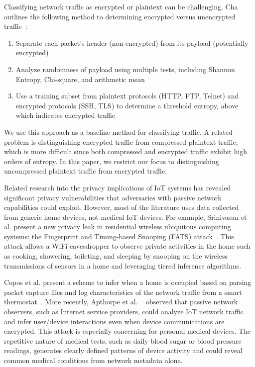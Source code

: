 Classifying network traffic as
encrypted or plaintext can be challenging. Cha outlines the following
method to determining encrypted versus unencrypted traffic~\cite{chaMachineLearning}:
\begin{enumerate}
  \item Separate each packet's header (non-encrypted) from its payload (potentially encrypted)
  \item Analyze randomness of payload using multiple tests, including Shannon Entropy, Chi-square, and arithmetic mean
  \item Use a training subset from plaintext protocols (HTTP, FTP, Telnet) and encrypted protocols (SSH, TLS) to determine a threshold entropy, above which indicates encrypted traffic
\end{enumerate}
\noindent
We use this approach as a baseline method for classifying traffic. A related
problem is distinguishing encrypted traffic from compressed plaintext traffic,
which is more difficult since both compressed and encrypted traffic exhibit
high orders of entropy. In this paper, we restrict our focus to distinguishing
uncompressed plaintext traffic from encrypted traffic.

Related research into the privacy implications of IoT systems has revealed
significant privacy vulnerabilities that adversaries with passive network
capabilities could exploit. However, most of the literature uses data
collected from generic home devices, not medical IoT devices. For example, Srinivasan et al. present a new privacy
leak in residential wireless ubiquitous computing systems: the Fingerprint and
Timing-based Snooping (FATS) attack~\cite{srinivasan2008fats}.
This attack allows a WiFi eavesdropper to
observe private activities in the home such as cooking, showering, toileting,
and sleeping by snooping on the wireless transmissions of sensors in a home
and leveraging tiered inference algorithms.

 Copos et al. present a scheme to infer when a home is occupied based on parsing
 packet capture files and log characteristics of the network traffic from a smart thermostat~\cite{coposIoT}.
More recently, Apthorpe et al. ~\cite{apthorpeIoT} observed that passive network observers, such as Internet service providers, could analyze IoT network traffic and infer user/device interactions even when device communications are encrypted. 
This attack is especially concerning for personal medical devices. The repetitive nature of medical tests, such as daily blood sugar or blood pressure readings, generates clearly defined patterns of device activity and could reveal common medical conditions from network metadata alone. 

